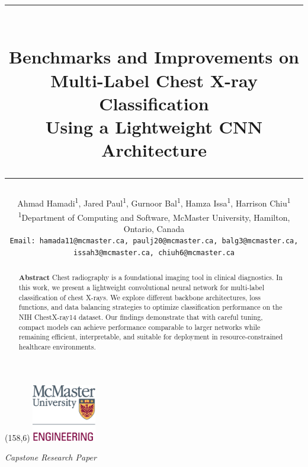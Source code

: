 \documentclass[12pt]{article}
\title{
\vspace{-2em}
\rule{\textwidth}{0.4pt} \\[0.5em]
\textbf{\LARGE Benchmarks and Improvements on\\ Multi-Label Chest X-ray Classification\\ Using a Lightweight CNN Architecture} \\
\rule{\textwidth}{0.4pt}
}
\author{
Ahmad Hamadi\textsuperscript{1}, Jared Paul\textsuperscript{1}, Gurnoor Bal\textsuperscript{1}, Hamza Issa\textsuperscript{1}, Harrison Chiu\textsuperscript{1} \\
\textsuperscript{1}Department of Computing and Software, McMaster University, Hamilton, Ontario, Canada \\
\texttt{Email: hamada11@mcmaster.ca, paulj20@mcmaster.ca, balg3@mcmaster.ca, issah3@mcmaster.ca, chiuh6@mcmaster.ca}
}
\date{}
\begin{document}
\begin{textblock}{40}(158,6)
    \includegraphics[width=2.8cm]{McMaster_Faculty_of_Engineering_logo.png}
\end{textblock}

\maketitle

\vspace{-1em}
\noindent\textit{Capstone Research Paper}

\vspace{1em}

\begin{abstract}
\noindent
\textbf{Abstract} Chest radiography is a foundational imaging tool in clinical diagnostics. In this work, we present a lightweight convolutional neural network for multi-label classification of chest X-rays. We explore different backbone architectures, loss functions, and data balancing strategies to optimize classification performance on the NIH ChestX-ray14 dataset. Our findings demonstrate that with careful tuning, compact models can achieve performance comparable to larger networks while remaining efficient, interpretable, and suitable for deployment in resource-constrained healthcare environments.
\end{abstract}

\vspace{1em}
\end{document}
